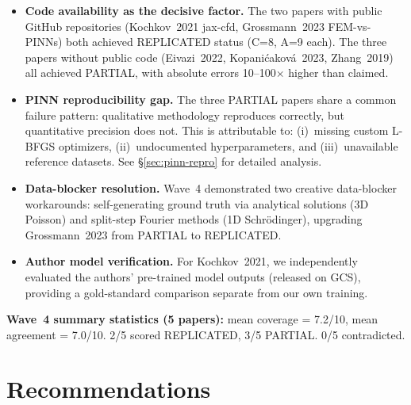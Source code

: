 \documentclass[11pt]{article}
\begin{document}
\begin{itemize}
\item \textbf{Code availability as the decisive factor.} The two papers with
  public GitHub repositories (Kochkov~2021 jax-cfd, Grossmann~2023
  FEM-vs-PINNs) both achieved REPLICATED status (C=8, A=9 each). The three
  papers without public code (Eivazi~2022, Kopani\'cakov\'a~2023,
  Zhang~2019) all achieved PARTIAL, with absolute errors 10--100$\times$
  higher than claimed.
\item \textbf{PINN reproducibility gap.} The three PARTIAL papers share a
  common failure pattern: qualitative methodology reproduces correctly, but
  quantitative precision does not. This is attributable to: (i)~missing
  custom L-BFGS optimizers, (ii)~undocumented hyperparameters, and
  (iii)~unavailable reference datasets. See \S\ref{sec:pinn-repro} for
  detailed analysis.
\item \textbf{Data-blocker resolution.} Wave~4 demonstrated two creative
  data-blocker workarounds: self-generating ground truth via analytical
  solutions (3D Poisson) and split-step Fourier methods (1D Schr\"odinger),
  upgrading Grossmann~2023 from PARTIAL to REPLICATED.
\item \textbf{Author model verification.} For Kochkov~2021, we independently
  evaluated the authors' pre-trained model outputs (released on GCS),
  providing a gold-standard comparison separate from our own training.
\end{itemize}

\noindent\textbf{Wave~4 summary statistics (5 papers):}
mean coverage = 7.2/10, mean agreement = 7.0/10.
2/5 scored REPLICATED, 3/5 PARTIAL.
0/5 contradicted.

\clearpage
\section{Recommendations}
\end{document}
